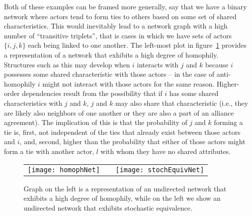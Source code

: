 Both of these examples can be framed more generally, say that we have a binary network where actors tend to form ties to others based on some set of shared characteristics. This would inevitably lead to a network graph with a high number of ``transitive triplets'', that is cases in which we have sets of actors $\{i,j,k\}$ each being linked to one another. The left-most plot in figure~\ref{fig:homphStochEquivNet} provides a representation of a network that exhibits a high degree of homophily.  Structures such as this may develop when $i$ interacts with $j$ and $k$ because $i$ possesses some shared characteristic with those actors -- in the case of anti-homophily $i$ might not interact with those actors for the same reason. Higher-order dependencies result from the possibility that if $i$ has some shared characteristics with $j$ and $k$, $j$ and $k$ may also share that characteristic (i.e., they are likely also neighbors of one another or they are also a part of an alliance agreement). The implication of this is that the probability of $j$ and $k$ forming a tie is, first, not independent of the ties that already exist between those actors and $i$, and, second, higher than the probability that either of those actors might form a tie with another actor, $l$ with whom they have no shared attributes. 


\begin{figure}[ht]
	\centering
	\begin{tabular}{lcr}
	\texttt{[image: homophNet]} & \hspace{2cm} &
	\texttt{[image: stochEquivNet]}	
	\end{tabular}
	\caption{Graph on the left is a representation of an undirected network that exhibits a high degree of homophily, while on the left we show an undirected network that exhibits stochastic equivalence. }
	\label{fig:homphStochEquivNet}
\end{figure}


